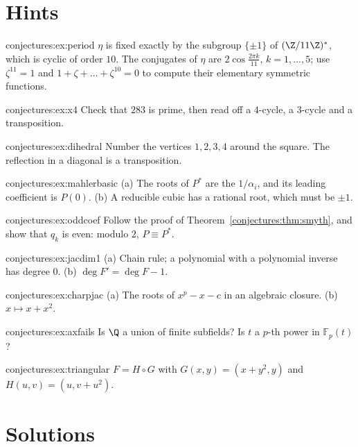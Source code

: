 \section{Hints}

\begin{hint}{conjectures:ex:period}
$\eta$ is fixed exactly by the subgroup $\{\pm1\}$ of $(\Z/11\Z)^*$, which is cyclic of order $10$. The conjugates of $\eta$ are $2\cos\frac{2\pi k}{11}$,
$k=1,\dots,5$; use $\zeta^{11}=1$ and $1+\zeta+\dots+\zeta^{10}=0$ to compute their elementary symmetric functions.
\end{hint}
\begin{hint}{conjectures:ex:x4}
Check that $283$ is prime, then read off a $4$-cycle, a $3$-cycle and a transposition.
\end{hint}
\begin{hint}{conjectures:ex:dihedral}
Number the vertices $1,2,3,4$ around the square. The reflection in a diagonal is a transposition.
\end{hint}
\begin{hint}{conjectures:ex:mahlerbasic}
(a) The roots of $P^*$ are the $1/\alpha_i$, and its leading coefficient is $P(0)$. (b) A reducible cubic has a rational root, which must be $\pm1$.
\end{hint}
\begin{hint}{conjectures:ex:oddcoef}
Follow the proof of Theorem~\ref{conjectures:thm:smyth}, and show that $q_k$ is even: modulo $2$, $P\equiv P^*$.
\end{hint}
\begin{hint}{conjectures:ex:jacdim1}
(a) Chain rule; a polynomial with a polynomial inverse has degree $0$. (b) $\deg F'=\deg F-1$.
\end{hint}
\begin{hint}{conjectures:ex:charpjac}
(a) The roots of $x^p-x-c$ in an algebraic closure. (b) $x\mapsto x+x^2$.
\end{hint}
\begin{hint}{conjectures:ex:axfails}
Is $\Q$ a union of finite subfields? Is $t$ a $p$-th power in $\mathbb F_p(t)$?
\end{hint}
\begin{hint}{conjectures:ex:triangular}
$F=H\circ G$ with $G(x,y)=(x+y^2,y)$ and $H(u,v)=(u,v+u^2)$.
\end{hint}

\section{Solutions}

